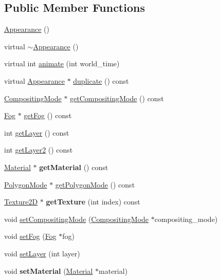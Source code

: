 \subsection*{Public Member Functions}
\begin{CompactItemize}
\item 
\hyperlink{classm3g_1_1Appearance_2e594c7b96cb5cfad839a98b57f5d42f}{Appearance} ()
\item 
virtual \hyperlink{classm3g_1_1Appearance_c05c93d7a0f286cb9471b6c667ffeee1}{$\sim$Appearance} ()
\item 
virtual int \hyperlink{classm3g_1_1Appearance_8aad1ceab4c2a03609c8a42324ce484d}{animate} (int world\_\-time)
\item 
virtual \hyperlink{classm3g_1_1Appearance}{Appearance} $\ast$ \hyperlink{classm3g_1_1Appearance_ceaab703eb45cba7cf8705bc3a087127}{duplicate} () const 
\item 
\hyperlink{classm3g_1_1CompositingMode}{CompositingMode} $\ast$ \hyperlink{classm3g_1_1Appearance_e4045934febb56891c15e14486b239a8}{getCompositingMode} () const 
\item 
\hyperlink{classm3g_1_1Fog}{Fog} $\ast$ \hyperlink{classm3g_1_1Appearance_93143a921b998ff69576147a59eb44d4}{getFog} () const 
\item 
int \hyperlink{classm3g_1_1Appearance_df831e0e0ebf9d7e997150e497e6a6cf}{getLayer} () const 
\item 
int \hyperlink{classm3g_1_1Appearance_0843200b0a6a79f7753380e833a1af0c}{getLayer2} () const 
\item 
\hypertarget{classm3g_1_1Appearance_a412c7074ed5d51f6b8b6fd89275c405}{
\hyperlink{classm3g_1_1Material}{Material} $\ast$ \textbf{getMaterial} () const }
\label{classm3g_1_1Appearance_a412c7074ed5d51f6b8b6fd89275c405}

\item 
\hyperlink{classm3g_1_1PolygonMode}{PolygonMode} $\ast$ \hyperlink{classm3g_1_1Appearance_dd3ddcefcd18339150d281b155602886}{getPolygonMode} () const 
\item 
\hypertarget{classm3g_1_1Appearance_987cc21bd78d0e4e664da717479bdd57}{
\hyperlink{classm3g_1_1Texture2D}{Texture2D} $\ast$ \textbf{getTexture} (int index) const }
\label{classm3g_1_1Appearance_987cc21bd78d0e4e664da717479bdd57}

\item 
void \hyperlink{classm3g_1_1Appearance_8f9514f1c01268fff95b7c31f3a194b6}{setCompositingMode} (\hyperlink{classm3g_1_1CompositingMode}{CompositingMode} $\ast$compositing\_\-mode)
\item 
void \hyperlink{classm3g_1_1Appearance_bc1a612006d6b4c3d443ff6ab542c788}{setFog} (\hyperlink{classm3g_1_1Fog}{Fog} $\ast$fog)
\item 
void \hyperlink{classm3g_1_1Appearance_fbd2fbd594c8ee140b028f505631f682}{setLayer} (int layer)
\item 
\hypertarget{classm3g_1_1Appearance_1dfd1a55fa3cc625719dab8e95c8a2de}{
void \textbf{setMaterial} (\hyperlink{classm3g_1_1Material}{Material} $\ast$material)}
\label{classm3g_1_1Appearance_1dfd1a55fa3cc625719dab8e95c8a2de}


\end{CompactItemize}
